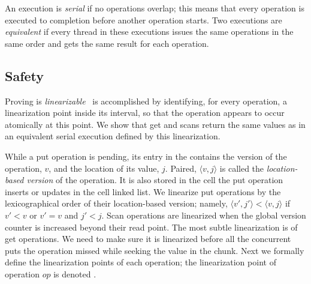 An execution is \emph{serial} if no operations overlap; this means that every operation is
executed to completion before another operation starts.
Two executions are \emph{equivalent} if every thread in these executions issues the same
operations in the same order and gets the same result for each operation.


\subsection{Safety}
Proving {\kiwi} is \emph{linearizable}~\cite{HerlihyW1990} %
is accomplished by identifying, for every operation, a linearization point inside its interval, so that the operation appears to occur atomically at this point. %
We show that get and scans return the same values as in an equivalent serial execution defined by this linearization.

While a put operation is pending, its entry in the  contains the version of the operation, $v$, and the location of its value, $j$. Paired, $\langle v, j\rangle$ is called the \emph{location-based version} of the operation. It is also stored in the cell the put operation inserts or updates in the cell linked list.
We linearize put operations by the lexicographical order of their location-based version; namely, $\langle v', j'\rangle < \langle v, j\rangle$ if $v'<v$ or $v'=v$ and $j'<j$. Scan operations are linearized when the global version counter is increased beyond their read point. The most subtle linearization is of get operations. We need to make sure it is linearized before all the concurrent puts the operation missed while seeking the value in the chunk. Next we formally define the linearization points of each operation; the linearization point of operation $op$ is denoted . 

